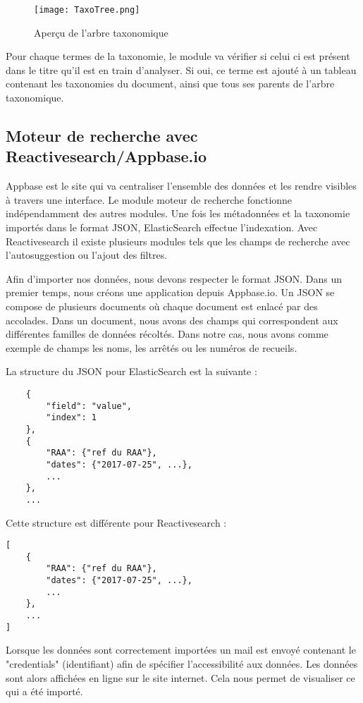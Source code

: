 \begin{figure}[h!]
  \centering
  \texttt{[image: TaxoTree.png]}
	\caption[]{Aperçu de l'arbre taxonomique}
  \label{fig:tree}
\end{figure}

Pour chaque termes de la taxonomie, le module va vérifier si celui ci est présent dans le titre qu'il est en train d'analyser.
Si oui, ce terme est ajouté à un tableau contenant les taxonomies du document, ainsi que tous ses parents de l'arbre taxonomique.


\subsection{Moteur de recherche avec Reactivesearch/Appbase.io}
Appbase est le site qui va centraliser l'ensemble des données et les rendre visibles à travers une interface.
Le module moteur de recherche fonctionne indépendamment des autres modules. Une fois les métadonnées et la taxonomie importés dans le format JSON, ElasticSearch effectue l'indexation.
Avec Reactivesearch il existe plusieurs modules tels que les champs de recherche avec l'autosuggestion ou l'ajout des filtres.  

Afin d'importer nos données, nous devons respecter le format JSON\@.
Dans un premier temps, nous créons une application depuis Appbase.io. 
Un JSON se compose de plusieurs documents où chaque document est enlacé par des accolades.
Dans un document, nous avons des champs qui correspondent aux différentes familles de données récoltés.
Dans notre cas, nous avons comme exemple de champs les noms, les arrêtés ou les numéros de recueils.

La structure du JSON pour ElasticSearch est la suivante :
\begin{lstlisting}
	{
		"field": "value",
		"index": 1
	},
	{
		"RAA": {"ref du RAA"},
		"dates": {"2017-07-25", ...},
		...
	},
	...
\end{lstlisting}

Cette structure est différente pour Reactivesearch :
\begin{lstlisting}
[
	{
		"RAA": {"ref du RAA"},
		"dates": {"2017-07-25", ...},
		...
	}, 
	...
]
\end{lstlisting}

Lorsque les données sont correctement importées un mail est envoyé contenant le "credentials" (identifiant) afin de spécifier l'accessibilité aux données.
Les données sont alors affichées en ligne sur le site internet.
Cela nous permet de visualiser ce qui a été importé. 

